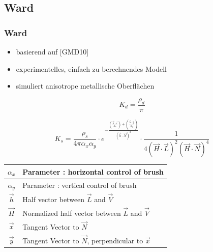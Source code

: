 \documentclass[11pt]{beamer}
\begin{document}
\subsection{Ward}
\begin{frame}[allowframebreaks]
\frametitle{Ward}

\begin{itemize}
\item basierend auf [GMD10]
\item experimentelles, einfach zu berechnendes Modell
\item simuliert anisotrope metallische Oberflächen
\end{itemize}

\begin{equation}
K_d = \frac{\rho_d}{\pi}
\end{equation}

\begin{equation}
K_s = \frac{\rho_s}{4 \pi \alpha_x \alpha_y } 
\cdot e^
{
- \frac{(\frac{\vec{h} \cdot \vec{x}}{\alpha_x})+(\frac{\vec{h} \cdot \vec{y}}{\alpha_y})}
{(\vec{h} \cdot \vec{N})^2}
}
\cdot 
\frac{1}{4 (\vec{H} \cdot \vec{L})^2 (\vec{H} \cdot \vec{N})^4}
\end{equation}

\framebreak

\begin{table}[H]
\begin{tabular}{| c | l |}
\hline
$\alpha_x$ & Parameter : horizontal control of brush\\ \hline
$\alpha_y$ & Parameter : vertical control of brush \\ \hline
$\vec{h}$ & Half vector between $\vec{L}$ and $\vec{V}$ \\ \hline
$\vec{H}$ & Normalized half vector between $\vec{L}$ and $\vec{V}$ \\ \hline
$\vec{x}$ & Tangent Vector to $\vec{N}$ \\ \hline
$\vec{y}$ & Tangent Vector to $\vec{N}$, perpendicular to $\vec{x}$ \\ \hline
\end{tabular}
\end{table}

\framebreak

\begin{figure}[H]
\centering


\end{figure}
\end{frame}
\end{document}
